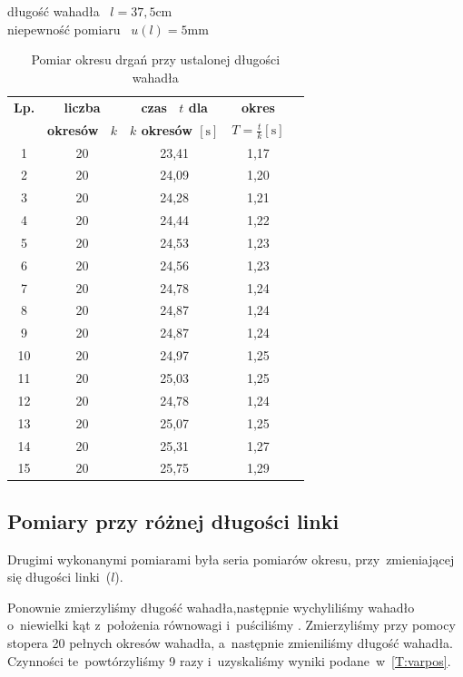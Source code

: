 \documentclass{fizraport}
\begin{document}
\begin{table}[!ht]
\caption{Pomiar okresu drgań przy ustalonej długości wahadła}
\bigskip%
długość wahadła ~$l = 37,5 $cm \\ 
niepewność pomiaru ~$u(l) = 5$mm
\label{T:equipos}
\begin{center}
\begin{tabular}{| c | c | c | c | c |}
\hline
\textbf{Lp.} & \textbf{ liczba }      & \textbf{czas ~$t$ dla }           & \textbf{okres}   \\
             & \textbf{okresów ~$k$ } & \textbf{$k$ okresów $[\text{s}]$} & \textbf{$T = \frac{t}{k} [\text{s}]$}   \\
\hline

 1 & 20 & 23,41& 1,17\\ \hline
 2 & 20 & 24,09& 1,20\\ \hline
 3 & 20 & 24,28& 1,21\\ \hline
 4 & 20 & 24,44& 1,22\\ \hline
 5 & 20 & 24,53& 1,23\\ \hline
 6 & 20 & 24,56& 1,23\\ \hline
 7 & 20 & 24,78& 1,24\\ \hline
 8 & 20 & 24,87& 1,24\\ \hline
 9 & 20 & 24,87& 1,24\\ \hline
10 & 20 & 24,97& 1,25\\ \hline
11 & 20 & 25,03& 1,25\\ \hline
12 & 20 & 24,78& 1,24\\ \hline
13 & 20 & 25,07& 1,25\\ \hline
14 & 20 & 25,31& 1,27\\ \hline
15 & 20 & 25,75& 1,29\\ \hline
\end{tabular}
\end{center}
\end{table}

\subsection{Pomiary przy różnej długości linki}
Drugimi wykonanymi pomiarami była seria pomiarów okresu, przy~zmieniającej się długości linki~($l$). 

Ponownie zmierzyliśmy długość wahadła,następnie wychyliliśmy wahadło o~niewielki kąt z~położenia równowagi i~puściliśmy .  Zmierzyliśmy przy pomocy stopera 20 pełnych okresów wahadła, a~następnie zmieniliśmy długość wahadła. Czynności te~powtórzyliśmy 9 razy i~uzyskaliśmy wyniki podane~w~\tablename{\ref{T:varpos}}.
\end{document}
